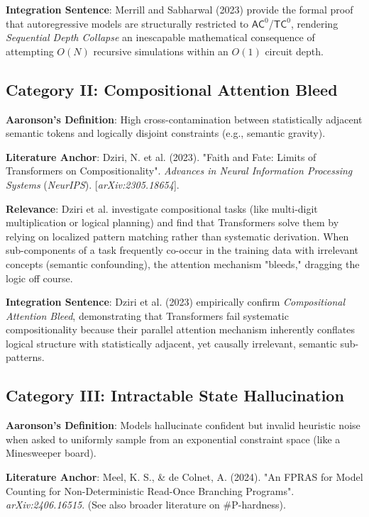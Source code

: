 \documentclass{article}
\begin{document}
\textbf{Integration Sentence}: Merrill and Sabharwal (2023) provide the formal proof that autoregressive models are structurally restricted to $\mathsf{AC}^0$/$\mathsf{TC}^0$, rendering \textit{Sequential Depth Collapse} an inescapable mathematical consequence of attempting $O(N)$ recursive simulations within an $O(1)$ circuit depth.

\subsection{Category II: Compositional Attention Bleed}
\textbf{Aaronson's Definition}: High cross-contamination between statistically adjacent semantic tokens and logically disjoint constraints (e.g., semantic gravity).

\textbf{Literature Anchor}: Dziri, N. et al. (2023). "Faith and Fate: Limits of Transformers on Compositionality". \textit{Advances in Neural Information Processing Systems} (\textit{NeurIPS}). [\textit{arXiv:2305.18654}].

\textbf{Relevance}: Dziri et al. investigate compositional tasks (like multi-digit multiplication or logical planning) and find that Transformers solve them by relying on localized pattern matching rather than systematic derivation. When sub-components of a task frequently co-occur in the training data with irrelevant concepts (semantic confounding), the attention mechanism "bleeds," dragging the logic off course.

\textbf{Integration Sentence}: Dziri et al. (2023) empirically confirm \textit{Compositional Attention Bleed}, demonstrating that Transformers fail systematic compositionality because their parallel attention mechanism inherently conflates logical structure with statistically adjacent, yet causally irrelevant, semantic sub-patterns.

\subsection{Category III: Intractable State Hallucination}
\textbf{Aaronson's Definition}: Models hallucinate confident but invalid heuristic noise when asked to uniformly sample from an exponential constraint space (like a Minesweeper board).

\textbf{Literature Anchor}: Meel, K. S., \& de Colnet, A. (2024). "An FPRAS for Model Counting for Non-Deterministic Read-Once Branching Programs". \textit{arXiv:2406.16515}. (See also broader literature on \#P-hardness).
\end{document}
